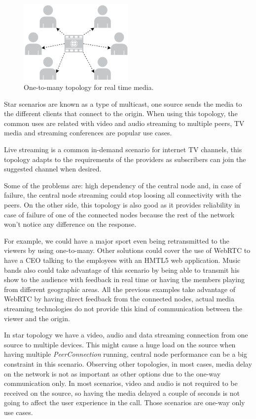  \begin{figure}[h]
  \centering
    \includegraphics[width=0.5\textwidth]{./figures/star.pdf}
      \caption[One-to-many topology for real time media]{One-to-many topology for real time media.}
	\label{fig:starExample}
\end{figure}

Star scenarios are known as a type of multicast, one source sends the media to the different clients that connect to the origin. When using this topology, the common uses are related with video and audio streaming to multiple peers, TV media and streaming conferences are popular use cases.

Live streaming is a common in-demand scenario for internet TV channels, this topology adapts to the requirements of the providers as subscribers can join the suggested channel when desired. 

Some of the problems are: high dependency of the central node and, in case of failure, the central node streaming could stop loosing all connectivity with the peers. On the other side, this topology is also good as it provides reliability in case of failure of one of the connected nodes because the rest of the network won't notice any difference on the response. 

For example, we could have a major sport even being retransmitted to the viewers by using one-to-many. Other solutions could cover the use of WebRTC to have a CEO talking to the employees with an HMTL5 web application. Music bands also could take advantage of this scenario by being able to transmit his show to the audience with feedback in real time or having the members playing from different geographic areas. All the previous examples take advantage of WebRTC by having direct feedback from the connected nodes, actual media streaming technologies do not provide this kind of communication between the viewer and the origin.

In star topology we have a video, audio and data streaming connection from one source to multiple devices. This might cause a huge load on the source when having multiple {\it PeerConnection} running, central node performance can be a big constraint in this scenario. Observing other topologies, in most cases, media delay on the network is not as important as other options due to the one-way communication only. In most scenarios, video and audio is not required to be received on the source, so having the media delayed a couple of seconds is not going to affect the user experience in the call. Those scenarios are one-way only use cases.

